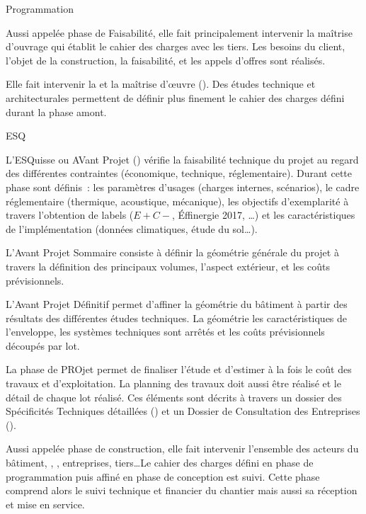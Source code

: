 \begin{blockdescription}{Programmation}
    \item[Programmation] Aussi appelée phase de Faisabilité, elle fait principalement intervenir la
          maîtrise d’ouvrage qui établit le cahier des charges avec les tiers. Les besoins
          du client, l’objet de la construction, la faisabilité, et les appels d’offres
          sont réalisés.
    \item[Conception] Elle fait intervenir la  et la maîtrise d’œuvre ().
          Des études technique et architecturales permettent de définir plus finement le cahier des charges
          défini durant la phase amont.
          \begin{blockdescription}{ESQ}
              \item [\abr{ESQ}] L’ESQuisse ou AVant Projet () vérifie la faisabilité technique du projet au regard
                    des différentes contraintes (économique, technique, réglementaire). Durant cette
                    phase sont définis~: les paramètres d’usages
                    (charges internes, scénarios), le cadre réglementaire (thermique, acoustique, mécanique),
                    les objectifs d’exemplarité à travers l’obtention de labels ($E+C-$,
                     Éffinergie 2017, \dots) et les caractéristiques de l’implémentation
                    (données climatiques, étude du sol\dots).
              \item [\abr{APS}] L’Avant Projet Sommaire consiste à définir la géométrie générale
                    du projet à travers la définition des principaux volumes, l’aspect extérieur,
                    et les coûts prévisionnels.
              \item [\abr{APD}] L’Avant Projet Définitif permet d’affiner la géométrie du bâtiment
                    à partir des résultats des différentes études techniques. La géométrie
                    les caractéristiques de l’enveloppe, les systèmes techniques sont
                    arrêtés et les coûts prévisionnels découpés par lot.
              \item [\abr{PRO}] La phase de PROjet permet de finaliser l’étude et d’estimer
                     à la fois le coût des travaux et d’exploitation. La planning des travaux
                     doit aussi être réalisé et le détail de chaque lot réalisé. Ces éléments
                     sont décrits à travers un dossier des Spécificités Techniques
                     détaillées () et un Dossier de Consultation des Entreprises ().
          \end{blockdescription}
    \item[Réalisation] Aussi appelée phase de construction, elle fait intervenir l’ensemble des acteurs
          du bâtiment, , , entreprises, tiers\dots Le cahier des charges défini
          en phase de programmation puis affiné en phase de conception est suivi. Cette
          phase comprend alors le suivi technique et financier du chantier mais aussi sa
          réception et mise en service.
\end{blockdescription}
